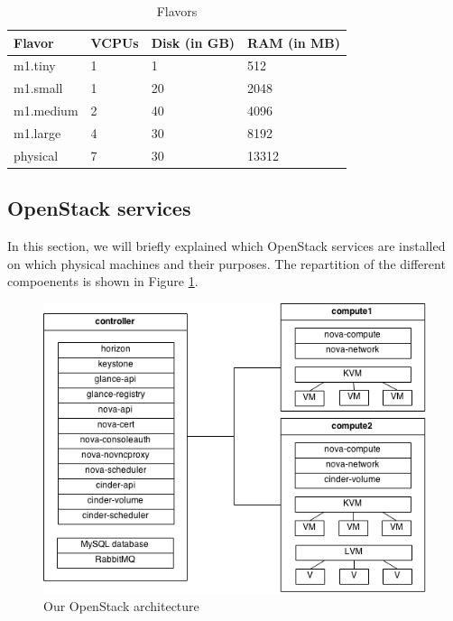 \begin{table}[h]
	\centering
	\begin{tabular}{|l|l|l|l|}
		\hline
		\textbf{Flavor} & \textbf{VCPUs} & \textbf{Disk (in GB)} & \textbf{RAM (in MB)}\\
		\hline
		m1.tiny & 1 & 1 & 512 \\
		m1.small & 1 & 20 & 2048 \\
		m1.medium & 2 & 40 & 4096 \\
		m1.large & 4 & 30 & 8192 \\
		physical & 7 & 30 & 13312 \\
		\hline
	\end{tabular}
	\caption{Flavors}
	\label{table:flavors_list_2}
\end{table}



\subsection{OpenStack services} %
In this section, we will briefly explained which OpenStack services are installed on which physical machines and their purposes. The repartition of the different compoenents is shown in Figure \ref{fig:os_arch}.

\begin{figure}[h]
	\centering
	\includegraphics[scale=0.6]{figures/os_arch.png}
	\caption{Our OpenStack architecture}
	\label{fig:os_arch}
\end{figure}

